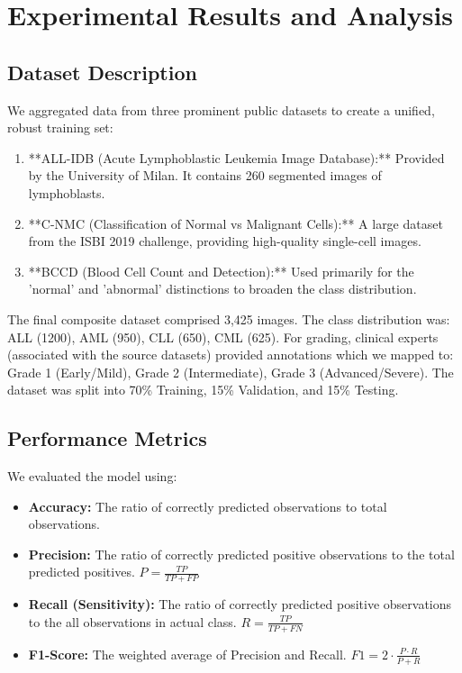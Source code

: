 \documentclass[journal]{IEEEtran}
\begin{document}
\section{Experimental Results and Analysis}

\subsection{Dataset Description}
We aggregated data from three prominent public datasets to create a unified, robust training set:
\begin{enumerate}
    \item **ALL-IDB (Acute Lymphoblastic Leukemia Image Database):** Provided by the University of Milan. It contains 260 segmented images of lymphoblasts.
    \item **C-NMC (Classification of Normal vs Malignant Cells):** A large dataset from the ISBI 2019 challenge, providing high-quality single-cell images.
    \item **BCCD (Blood Cell Count and Detection):** Used primarily for the 'normal' and 'abnormal' distinctions to broaden the class distribution.
\end{enumerate}
The final composite dataset comprised 3,425 images. The class distribution was: ALL (1200), AML (950), CLL (650), CML (625). For grading, clinical experts (associated with the source datasets) provided annotations which we mapped to: Grade 1 (Early/Mild), Grade 2 (Intermediate), Grade 3 (Advanced/Severe).
The dataset was split into 70\% Training, 15\% Validation, and 15\% Testing.

\subsection{Performance Metrics}
We evaluated the model using:
\begin{itemize}
    \item \textbf{Accuracy:} The ratio of correctly predicted observations to total observations.
    \item \textbf{Precision:} The ratio of correctly predicted positive observations to the total predicted positives. $P = \frac{TP}{TP+FP}$
    \item \textbf{Recall (Sensitivity):} The ratio of correctly predicted positive observations to the all observations in actual class. $R = \frac{TP}{TP+FN}$
    \item \textbf{F1-Score:} The weighted average of Precision and Recall. $F1 = 2 \cdot \frac{P \cdot R}{P + R}$
\end{itemize}
\end{document}
